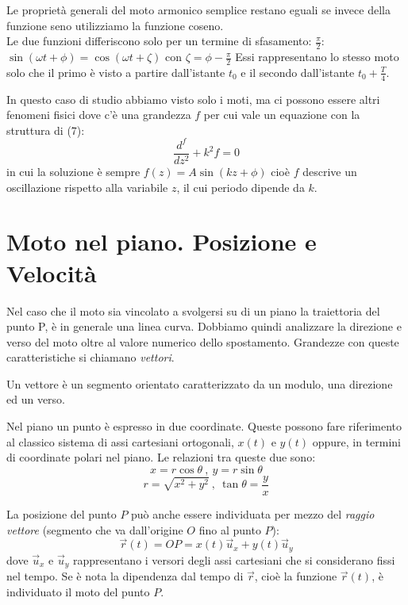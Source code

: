 \documentclass[class=book, crop=false, oneside, 12pt]{standalone}
\begin{document}
Le proprietà generali del moto armonico semplice restano eguali se invece della funzione seno utilizziamo la funzione coseno.\\
Le due funzioni differiscono solo per un termine di sfasamento: \(\frac{\pi}{2}\): \(\sin(\omega t + \phi) = \cos(\omega t + \zeta)\) con \(\zeta = \phi - \frac{\pi}{2}\)
Essi rappresentano lo stesso moto solo che il primo è visto a partire dall'istante $t_0$ e il secondo dall'istante \(t_0 + \frac{T}{4}\).

In questo caso di studio abbiamo visto solo i moti, ma ci possono essere altri fenomeni fisici dove c'è una grandezza \(f\) per cui vale un equazione con la struttura di (7):
\begin{equation}
  \frac {d^f} { dz^2} + k^2 f = 0
\end{equation}
in cui la soluzione è sempre \(f(z) = A \sin(kz + \phi)\) cioè \(f\) descrive un oscillazione rispetto alla variabile \(z\), il cui periodo dipende da \(k\).

\section{Moto nel piano. Posizione e Velocità}

Nel caso che il moto sia vincolato a svolgersi su di un piano la traiettoria del punto P,
è in generale  una linea curva. Dobbiamo quindi analizzare la direzione e verso del moto oltre al valore numerico dello spostamento.
Grandezze con queste caratteristiche si chiamano \emph{vettori}.

Un vettore è un segmento orientato caratterizzato da un modulo, una direzione ed un verso.

Nel piano un punto è espresso in due coordinate. Queste possono fare riferimento al classico sistema di assi cartesiani ortogonali,
\(x(t)\) e \(y(t)\) oppure, in termini di coordinate polari nel piano.
Le relazioni tra queste due sono:
\begin{equation}
  x = r \cos \theta \ , \ y = r \sin \theta
\end{equation}
\begin{equation}
  r = \sqrt{x^2 + y^2 } \ , \ \tan \theta = \frac{y}{x}
\end{equation}

La posizione del punto \(P\) può anche essere individuata per mezzo del \emph{raggio vettore} (segmento che va dall'origine \(O\) fino al punto \(P\)):
\begin{equation}
  \overrightarrow{r}(t) = OP = x(t) \overrightarrow{u}_x + y(t) \overrightarrow{u}_y
\end{equation}
dove \(\overrightarrow{u}_x\) e \(\overrightarrow{u}_y\) rappresentano i versori degli assi cartesiani che si considerano fissi nel tempo.
Se è nota la dipendenza dal tempo di \(\overrightarrow{r}\), cioè la funzione \(\overrightarrow{r}(t)\), è individuato il moto del punto \(P\).
\end{document}
